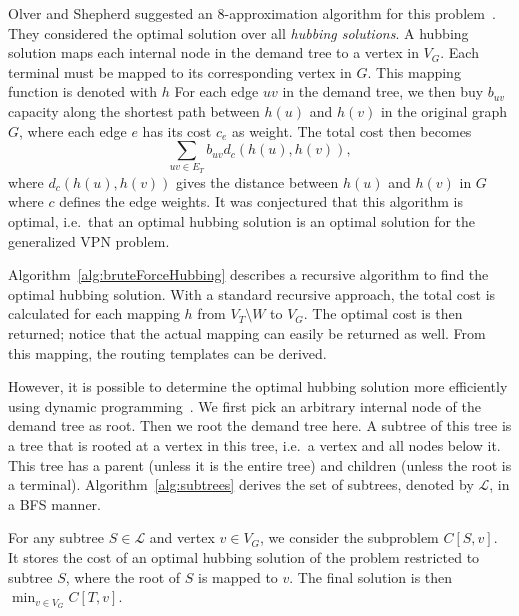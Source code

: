 Olver and Shepherd suggested an 8-approximation algorithm for this problem~\cite{olver2010approxrnd}.
They considered the optimal solution over all \emph{hubbing solutions}.
A hubbing solution maps each internal node in the demand tree to a vertex in $V_G$.
Each terminal must be mapped to its corresponding vertex in $G$.
This mapping function is denoted with $h$
For each edge $uv$ in the demand tree, we then buy $b_{uv}$ capacity along the shortest path between $h(u)$ and $h(v)$ in the original graph $G$, where each edge $e$ has its cost $c_e$ as weight.
The total cost then becomes
\[
    \sum_{uv \in E_T} b_{uv} d_c(h(u), h(v)),
\]
where $d_c(h(u), h(v))$ gives the distance between $h(u)$ and $h(v)$ in $G$ where $c$ defines the edge weights.
It was conjectured that this algorithm is optimal, i.e.\ that an optimal hubbing solution is an optimal solution for the generalized VPN problem.

Algorithm~\ref{alg:bruteForceHubbing} describes a recursive algorithm to find the optimal hubbing solution.
With a standard recursive approach, the total cost is calculated for each mapping $h$ from $V_T \setminus W$ to $V_G$.
The optimal cost is then returned; notice that the actual mapping can easily be returned as well.
From this mapping, the routing templates can be derived.

However, it is possible to determine the optimal hubbing solution more efficiently using dynamic programming~\cite{olver2010approxrnd}.
We first pick an arbitrary internal node of the demand tree as root.
Then we root the demand tree here.
A subtree of this tree is a tree that is rooted at a vertex in this tree, i.e.\ a vertex and all nodes below it.
This tree has a parent (unless it is the entire tree) and children (unless the root is a terminal).
Algorithm~\ref{alg:subtrees} derives the set of subtrees, denoted by $\mathcal L$, in a BFS manner.

For any subtree $S \in \mathcal L$ and vertex $v \in V_G$, we consider the subproblem $C[S, v]$.
It stores the cost of an optimal hubbing solution of the problem restricted to subtree $S$, where the root of $S$ is mapped to $v$.
The final solution is then $\min_{v \in V_G} C[T, v]$.


